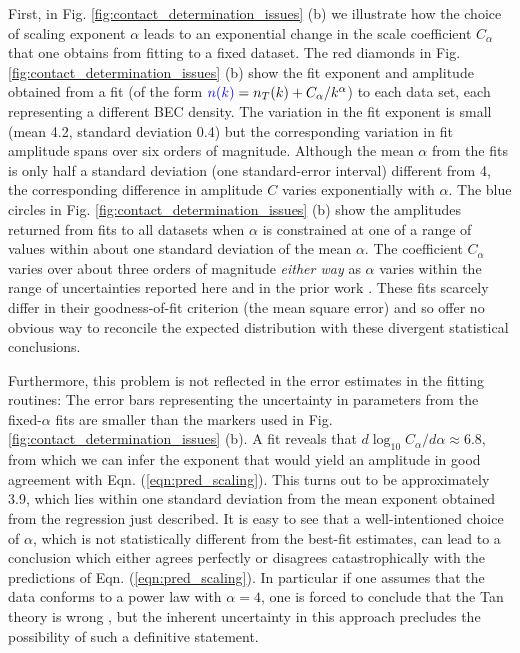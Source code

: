 	First, in Fig. \ref{fig:contact_determination_issues} (b) we illustrate how the choice of scaling exponent $\alpha$ leads to an exponential change in the scale coefficient $C_\alpha$ that one obtains from fitting to a fixed dataset.
	The red diamonds in Fig. \ref{fig:contact_determination_issues} (b) show the fit exponent and amplitude obtained from a fit (of the form $\blu{n(k)} %
	= n_T(k) + C_\alpha/k^\alpha$) to each data set, each representing a different BEC density. 
	The variation in the fit exponent is small (mean 4.2, standard deviation 0.4) but the corresponding variation in fit amplitude spans over six orders of magnitude.
	Although the mean $\alpha$ from the fits is only half a standard deviation (one standard-error interval) different from 4, the corresponding difference in amplitude $C$ varies exponentially with $\alpha$.
	The blue circles in Fig. \ref{fig:contact_determination_issues} (b) show the amplitudes returned from fits to all datasets when $\alpha$ is constrained at one of a range of values within about one standard deviation of the mean $\alpha$. 
	The coefficient $C_\alpha$ varies over about three orders of magnitude \emph{either way} as $\alpha$ varies within the range of uncertainties reported here and in the prior work \cite{Chang16}. 
	These fits scarcely differ in their goodness-of-fit criterion (the mean square error) and so offer no obvious way to reconcile the expected distribution with these divergent statistical conclusions.
	
	Furthermore, this problem is not reflected in the error estimates in the fitting routines: The error bars representing the uncertainty in parameters from the fixed-$\alpha$ fits are smaller than the markers used in Fig. \ref{fig:contact_determination_issues} (b). 
	A fit reveals that $d \log_{10} C_\alpha/d\alpha \approx 6.8$, from which we can infer the exponent that would yield an amplitude in good agreement with Eqn. (\ref{eqn:pred_scaling}). 
	This turns out to be approximately 3.9, which lies within one standard deviation from the mean exponent obtained from the regression just described. 
	It is easy to see that a well-intentioned choice of $\alpha$, which is not statistically different from the best-fit estimates, can lead to a conclusion which either agrees perfectly or disagrees catastrophically with the predictions of Eqn. (\ref{eqn:pred_scaling}).
	In particular if one assumes that the data conforms to a power law with $\alpha=4$, one is forced to conclude that the Tan theory is wrong , but the inherent uncertainty in this approach precludes the possibility of such a definitive statement.
	

